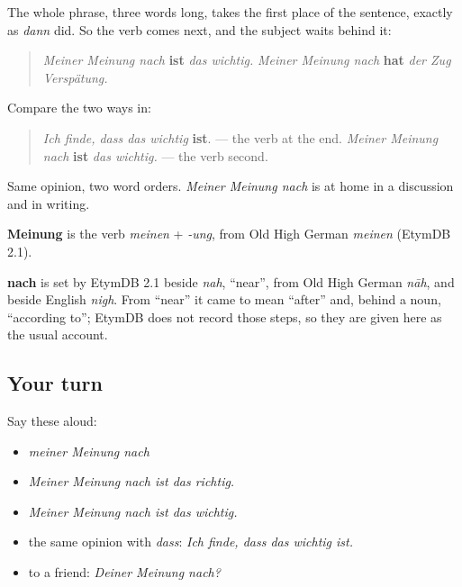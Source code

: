 \begin{grammarlens}[title={Grammar Lens: one place, then the verb}]
The whole phrase, three words long, takes the first place of the sentence, exactly as \emph{dann} did. So the verb comes next, and the subject waits behind it:

\begin{quote}
\emph{Meiner Meinung nach} \textbf{ist} \emph{das wichtig.} \emph{Meiner Meinung nach} \textbf{hat} \emph{der Zug Verspätung.}
\end{quote}

Compare the two ways in:

\begin{quote}
\emph{Ich finde, dass das wichtig} \textbf{ist}. — the verb at the end. \emph{Meiner Meinung nach} \textbf{ist} \emph{das wichtig.} — the verb second.
\end{quote}

Same opinion, two word orders. \emph{Meiner Meinung nach} is at home in a discussion and in writing.
\end{grammarlens}

\begin{cousinweb}
\textbf{Meinung} is the verb \emph{meinen} + \emph{-ung}, from Old High German \emph{meinen} (EtymDB 2.1).

\textbf{nach} is set by EtymDB 2.1 beside \emph{nah}, \textquotedblleft{}near\textquotedblright{}, from Old High German \emph{nāh}, and beside English \emph{nigh}. From \textquotedblleft{}near\textquotedblright{} it came to mean \textquotedblleft{}after\textquotedblright{} and, behind a noun, \textquotedblleft{}according to\textquotedblright{}; EtymDB does not record those steps, so they are given here as the usual account.
\end{cousinweb}

\subsection*{Your turn}
Say these aloud:

\begin{itemize}
\raggedright
  \item \emph{meiner Meinung nach}
  \item \emph{Meiner Meinung nach ist das richtig.}
  \item \emph{Meiner Meinung nach ist das wichtig.}
  \item the same opinion with \emph{dass}: \emph{Ich finde, dass das wichtig ist.}
  \item to a friend: \emph{Deiner Meinung nach?}
\end{itemize}

